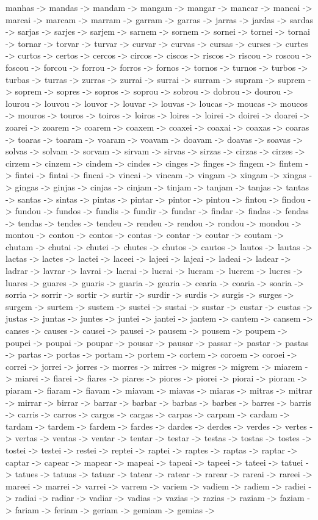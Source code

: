 \documentclass[a4paper,11pt]{article}
\begin{document}
manhas -> mandas -> mandam -> mangam -> mangar -> mancar -> mancai -> marcai -> marcam -> marram -> garram -> garras -> jarras -> jardas -> sardas -> sarjas -> sarjes -> sarjem -> sarnem -> sornem -> sornei -> tornei -> tornai -> tornar -> torvar -> turvar -> curvar -> curvas -> cursas -> curses -> curtes -> curtos -> certos -> cercos -> circos -> ciscos -> riscos -> riscou -> roscou -> foscou -> forcou -> forrou -> forros -> fornos -> tornos -> turnos -> turbos -> turbas -> turras -> zurras -> zurrai -> surrai -> surram -> supram -> suprem -> soprem -> sopres -> sopros -> soprou -> sobrou -> dobrou -> dourou -> lourou -> louvou -> louvor -> louvar -> louvas -> loucas -> moucas -> moucos -> mouros -> touros -> toiros -> loiros -> loires -> loirei -> doirei -> doarei -> zoarei -> zoarem -> coarem -> coaxem -> coaxei -> coaxai -> coaxas -> coaras -> toaras -> toaram -> voaram -> voavam -> doavam -> doavas -> soavas -> solvas -> solvam -> sorvam -> sirvam -> sirvas -> sirzas -> cirzas -> cirzes -> cirzem -> cinzem -> cindem -> cindes -> cinges -> finges -> fingem -> fintem -> fintei -> fintai -> fincai -> vincai -> vincam -> vingam -> xingam -> xingas -> gingas -> ginjas -> cinjas -> cinjam -> tinjam -> tanjam -> tanjas -> tantas -> santas -> sintas -> pintas -> pintar -> pintor -> pintou -> fintou -> findou -> fundou -> fundos -> fundis -> fundir -> fundar -> findar -> findas -> fendas -> tendas -> tendes -> tendeu -> rendeu -> rendou -> rondou -> mondou -> montou -> contou -> contos -> contas -> contar -> coutar -> coutam -> chutam -> chutai -> chutei -> chutes -> chutos -> cautos -> lautos -> lautas -> lactas -> lactes -> lactei -> laceei -> lajeei -> lajeai -> ladeai -> ladear -> ladrar -> lavrar -> lavrai -> lacrai -> lucrai -> lucram -> lucrem -> lucres -> luares -> guares -> guaris -> guaria -> gearia -> cearia -> coaria -> soaria -> sorria -> sorrir -> sortir -> surtir -> surdir -> surdis -> surgis -> surges -> surgem -> surtem -> sustem -> sustei -> sustai -> sustar -> custar -> custas -> justas -> juntas -> juntes -> juntei -> jantei -> jantem -> cantem -> cansem -> canses -> causes -> causei -> pausei -> pausem -> pousem -> poupem -> poupei -> poupai -> poupar -> pousar -> pausar -> passar -> pastar -> pastas -> partas -> portas -> portam -> portem -> cortem -> coroem -> coroei -> correi -> jorrei -> jorres -> morres -> mirres -> migres -> migrem -> miarem -> miarei -> fiarei -> fiares -> piares -> piores -> piorei -> piorai -> pioram -> piaram -> fiaram -> fiavam -> miavam -> miavas -> miaras -> mitras -> mitrar -> mirrar -> birrar -> barrar -> barbar -> barbas -> barbes -> barres -> barris -> carris -> carros -> cargos -> cargas -> carpas -> carpam -> cardam -> tardam -> tardem -> fardem -> fardes -> dardes -> derdes -> verdes -> vertes -> vertas -> ventas -> ventar -> tentar -> testar -> testas -> tostas -> tostes -> tostei -> testei -> restei -> reptei -> raptei -> raptes -> raptas -> raptar -> captar -> capear -> mapear -> mapeai -> tapeai -> tapeei -> tateei -> tatuei -> tatues -> tatuas -> tatuar -> tatear -> ratear -> rarear -> rareai -> rareei -> mareei -> marrei -> varrei -> varrem -> variem -> vadiem -> radiem -> radiei -> radiai -> radiar -> vadiar -> vadias -> vazias -> razias -> raziam -> faziam -> fariam -> feriam -> geriam -> gemiam -> gemias -> 
\end{document}
